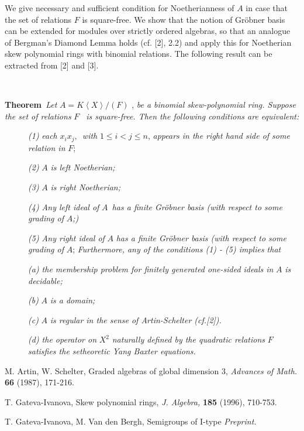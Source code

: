 \documentclass[12pt]{article}
\begin{document}
We give necessary and sufficient condition for Noetherianness of $A$ in case
that the set of relations $F$ is square-free. We show that the notion of
Gr\"{o}bner basis can be extended for modules over strictly ordered
algebras, so that an analogue of Bergman's Diamond Lemma holds (cf. [2],
2.2) and apply this for Noetherian skew polynomial rings with binomial
relations. The following result can be extracted from [2] and [3].

\smallskip\ 

\noindent \textbf{Theorem}\emph{\ Let }$A=K\left\langle X\right\rangle /(F)$%
, \emph{be a binomial skew-polynomial ring. Suppose the set of relations} $F$%
\emph{\ is square-free. Then the following conditions are equivalent:}

\begin{description}
\item[ ]  \emph{(1)} \emph{each} $x_ix_j,$\emph{\ with} $1\leq i<j\leq n$, 
\emph{appears in the right hand side of some relation in} $F$;

\item[ ]  \emph{(2)} $A$ \emph{is left Noetherian;}

\item[ ]  \emph{(3)} $A$ \emph{is right Noetherian;}

\item[ ]  \emph{(4) Any left ideal of }$A$\emph{\ has a finite Gr\"{o}bner
basis (with respect to some grading of} $A$\emph{;)}

\item[ ]  \emph{(5) Any right ideal of }$A$ \emph{has a finite Gr\"{o}bner
basis (with respect to some grading of }$A$; \emph{Furthermore, any of the
conditions (1) - (5) implies that}

\item[ ]  \emph{(a) the membership problem for finitely generated one-sided
ideals in }$A$ \emph{is decidable; }

\item[ ]  \emph{(b) }$A$ \emph{is a domain;}

\item[ ]  \emph{(c)} $A$ \emph{is regular in the sense of Artin-Schelter
(cf.[2]).}

\item[ ]  \emph{(d) the operator on} $X^2$ \emph{naturally defined by the
quadratic relations }$F$ \emph{satisfies the setheoretic Yang Baxter
equations.}
\end{description}

\begin{thebibliography}{1}
  M. Artin, W. Schelter, Graded algebras of global dimension
3, \emph{Advances of Math.} \textbf{66} (1987), 171-216.

  T. Gateva-Ivanova, Skew polynomial rings, \emph{J. Algebra, }%
\textbf{185} (1996), 710-753.

  T. Gateva-Ivanova, M. Van den Bergh, Semigroups of I-type 
\emph{Preprint.}
\end{thebibliography}
\end{document}
